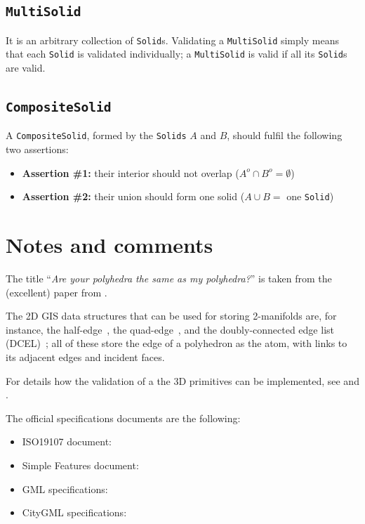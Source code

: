 \subsection{\texttt{MultiSolid}}
It is an arbitrary collection of \texttt{Solid}s.
Validating a \texttt{MultiSolid} simply means that each \texttt{Solid} is validated individually; a \texttt{MultiSolid} is valid if all its \texttt{Solid}s are valid.


\subsection{\texttt{CompositeSolid}}
A \texttt{CompositeSolid}, formed by the \texttt{Solids} $A$ and $B$, should fulfil the following two assertions:
\begin{itemize}
  \item \textbf{Assertion \#1:} their interior should not overlap ($A^{o} \cap B^{o} = \emptyset$)
  \item \textbf{Assertion \#2:} their union should form one solid ($A \cup B =$ one \texttt{Solid})
\end{itemize}


%
\section{Notes and comments}

The title ``\emph{Are your polyhedra the same as my polyhedra?}'' is taken from the (excellent) paper from \citet{Grunbaum03}.

The 2D GIS data structures that can be used for storing 2-manifolds are, for instance, the half-edge~\citep{Mantyla88}, the quad-edge~\citep{Guibas85}, and the doubly-connected edge list (DCEL)~\citep{Muller78}; all of these store the edge of a polyhedron as the atom, with links to its adjacent edges and incident faces.

For details how the validation of a the 3D primitives can be implemented, see \citet{13_cacaie} and \citet{18_ogdss_val3dity}.

The official specifications documents are the following:
\begin{itemize}
  \item ISO19107 document: \citet{ISO19107}
  \item Simple Features document: \citet{OGC-SF}
  \item GML specifications: \citet{OGC-GML}
  \item CityGML specifications: \citet{CityGML3.0CM}
\end{itemize}


